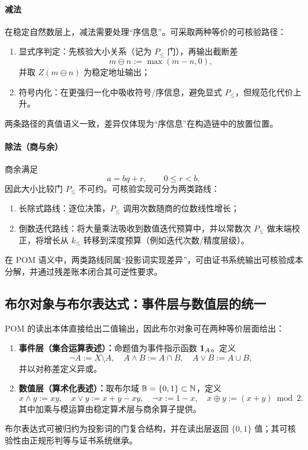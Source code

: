 \paragraph{减法} 在稳定自然数层上，减法需要处理“序信息”。可采取两种等价的可核验路径：
\begin{enumerate}
  \item 显式序判定：先核验大小关系（记为 $P_{\le}$ 门），再输出截断差
  $$
  m\ominus n:=\max(m-n,0),
  $$
  并取 $Z(m\ominus n)$ 为稳定地址输出；
  \item 符号内化：在更强归一化中吸收符号/序信息，避免显式 $P_{\le}$，但规范化代价上升。
\end{enumerate}
两条路径的真值语义一致，差异仅体现为“序信息”在构造链中的放置位置。

\paragraph{除法（商与余）} 商余满足
$$
a=bq+r,\qquad 0\le r<b,
$$
因此大小比较门 $P_{\le}$ 不可约。可核验实现可分为两类路线：
\begin{enumerate}
  \item 长除式路线：逐位决策，$P_{\le}$ 调用次数随商的位数线性增长；
  \item 倒数迭代路线：将大量乘法吸收到数值迭代预算中，并以常数次 $P_{\le}$ 做末端校正，将增长从 $k_{\le}$ 转移到深度预算（例如迭代次数/精度层级）。
\end{enumerate}
在 POM 语义中，两类路线同属“投影词实现差异”，可由证书系统输出可核验成本分解，并通过残差账本闭合其可逆性要求。

\subsection{布尔对象与布尔表达式：事件层与数值层的统一}
POM 的读出本体直接给出二值输出，因此布尔对象可在两种等价层面给出：
\begin{enumerate}
  \item \textbf{事件层（集合运算表述）：}命题值为事件指示函数 $\mathbf{1}_A$。定义
  $$
  \neg A := X\setminus A,\quad
  A\wedge B := A\cap B,\quad
  A\vee B := A\cup B,
  $$
  并以对称差定义异或。
  \item \textbf{数值层（算术化表述）：}取布尔域 $\mathbb{B}=\{0,1\}\subset\mathbb{N}$，定义
  $$
  x\wedge y := xy,\quad
  x\vee y := x+y-xy,\quad
  \neg x := 1-x,\quad
  x\oplus y := (x+y)\bmod 2.
  $$
  其中加乘与模运算由稳定算术层与商余算子提供。
\end{enumerate}
布尔表达式可被归约为投影词的门复合结构，并在读出层返回 $\{0,1\}$ 值；其可核验性由正规形判等与证书系统继承。

